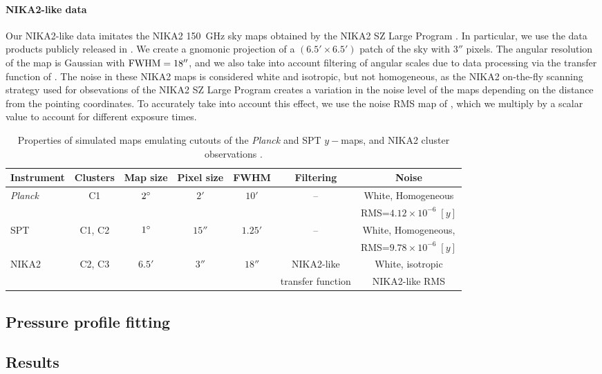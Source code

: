 \paragraph{NIKA2-like data}
Our NIKA2-like data imitates the NIKA2 150~GHz sky maps obtained by the NIKA2 SZ Large Program \citep{mayet_cluster_2020, perotto_nika2_2021}.
In particular, we use the data products publicly released in \citet{keruzore_exploiting_2020}.
We create a gnomonic projection of a $(6.5' \times 6.5')$ patch of the sky with $3''$ pixels.
The angular resolution of the map is Gaussian with ${\rm FWHM} = 18''$, and we also take into account filtering of angular scales due to data processing via the transfer function of \citet{keruzore_exploiting_2020}.
The noise in these NIKA2 maps is considered white and isotropic, but not homogeneous, as the NIKA2 on-the-fly scanning strategy used for obsevations of the NIKA2 SZ Large Program creates a variation in the noise level of the maps depending on the distance from the pointing coordinates.
To accurately take into account this effect, we use the noise RMS map of \citet{keruzore_exploiting_2020}, which we multiply by a scalar value to account for different exposure times.

\begin{table}[t]
    \centering
    \begin{tabular}{l c c c c c c}
        \toprule
        Instrument & Clusters & Map size & Pixel size & FWHM & Filtering & Noise \\
        \midrule
        \multirow{2}{*}{\textit{Planck}} & \multirow{2}{*}{C1} & \multirow{2}{*}{$2\degree$} & \multirow{2}{*}{$2'$} & \multirow{2}{*}{$10'$} & \multirow{2}{*}{--} & White, Homogeneous \\
            & & & & & & RMS=$4.12 \times 10^{-6} \; [y]$ \\
        \midrule
        \multirow{2}{*}{SPT} & \multirow{2}{*}{C1, C2} & \multirow{2}{*}{$1\degree$} & \multirow{2}{*}{$15''$} & \multirow{2}{*}{$1.25'$} & -- & White, Homogeneous, \\
            & & & & & & RMS=$9.78 \times 10^{-6} \; [y]$ \\
        \midrule
        \multirow{2}{*}{NIKA2} & \multirow{2}{*}{C2, C3} & \multirow{2}{*}{$6.5'$} & \multirow{2}{*}{$3''$} & \multirow{2}{*}{$18''$} & NIKA2-like & White, isotropic \\
                               & & & & & transfer function & NIKA2-like RMS \\
        \bottomrule
    \end{tabular}
    \caption{\normalfont
        Properties of simulated maps emulating cutouts of the \textit{Planck} \citep{planck_collaboration_planck_2016} and SPT \citep{bleem_cmbksz_2022} $y-$maps, and NIKA2 cluster observations \citep{keruzore_exploiting_2020}.
    }
    \label{tab:simu:map_props}
\end{table}

\subsection{Pressure profile fitting}

\subsection{Results}
